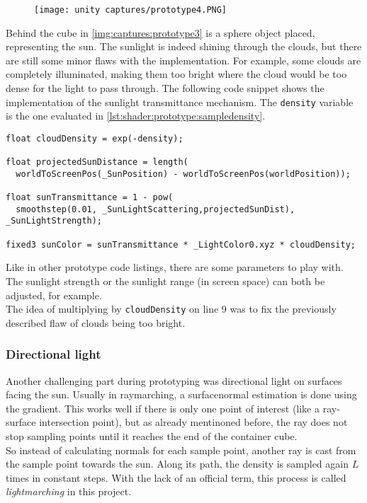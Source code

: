 \begin{figure}[H]
    \centering
    \texttt{[image: unity captures/prototype4.PNG]}
    \label{img:captures:prototype3}
\end{figure}

\noindent
Behind the cube in \autoref{img:captures:prototype3} is a sphere object placed, representing the sun. The sunlight is indeed shining through the clouds, but there are still some minor flaws with the implementation.
For example, some clouds are completely illuminated, making them too bright where the cloud would be too dense for the light to pass through.
\emptyline
The following code snippet shows the implementation of the sunlight transmittance mechanism. The \lstinline[language=HLSL]{density} variable is the one evaluated in \autoref{lst:shader:prototype:sampledensity}.

\begin{lstlisting}[language=HLSL, caption=Implementation of a sunlight transmittance mechanism., label=lst:shader:prototype:sunlighttransmittance]
float cloudDensity = exp(-density);

float projectedSunDistance = length(
  worldToScreenPos(_SunPosition) - worldToScreenPos(worldPosition));

float sunTransmittance = 1 - pow(
  smoothstep(0.01, _SunLightScattering,projectedSunDist), _SunLightStrength);

fixed3 sunColor = sunTransmittance * _LightColor0.xyz * cloudDensity;
\end{lstlisting}

\noindent
Like in other prototype code listings, there are some \gls{parameters} to play with. The sunlight strength or the sunlight range (in screen space) can both be adjusted, for example.
\\
The idea of multiplying by \lstinline[language=HLSL]{cloudDensity} on line 9 was to fix the previously described flaw of clouds being too bright. 

\clearpage
\subsubsection{Directional light}
Another challenging part during prototyping was directional light on surfaces facing the sun. Usually in \gls{raymarching}, a \gls{surfacenormal} estimation is done using the gradient.
This works well if there is only one point of interest (like a ray-surface intersection point), but as already mentinoned before, the ray does not stop sampling points until it reaches the end of the container cube.
\\
So instead of calculating normals for each sample point, another ray is cast from the sample point towards the sun.
Along its path, the density is sampled again $L$ times in constant steps. With the lack of an official term, this process is called \textit{\gls{lightmarching}} in this project.


